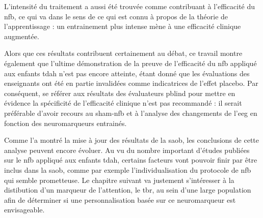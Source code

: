 L'intensité du traitement a aussi été trouvée comme contribuant à l'efficacité du \gls{nfb}, ce qui va dans le sens de ce qui est connu à propos de 
la théorie de l'apprentissage \citep{Mowrer1960} : un entrainement plus intense mène à une efficacité clinique augmentée. 

Alors que ces résultats contribuent certainement au débat, ce travail montre également que l'ultime démonstration de la preuve de l'efficacité du \gls{nfb}
appliqué aux enfants \gls{tdah} n'est pas encore atteinte, étant donné que les évaluations des enseignants ont été en partie invalidées comme indicatrices de 
l'effet placebo. Par conséquent, se référer aux résultats des évaluateurs \gls{pblind} pour mettre en évidence la spécificité de l'efficacité clinique n'est pas 
recommandé : il serait préférable d'avoir recours au sham-\gls{nfb} et à l'analyse des changements de l'\gls{eeg} en fonction des neuromarqueurs entrainés.

Comme l'a montré la mise à jour des résultats de la \gls{saob}, les conclusions de cette analyse peuvent encore évoluer. Au vu du nombre important 
d'études publiées sur le \gls{nfb} appliqué aux enfants \gls{tdah}, certains facteurs vont pouvoir finir par être inclus dans la \gls{saob}, comme par exemple 
l'individualisation du protocole de \gls{nfb} qui semble prometteuse. Le chapitre suivant va justement s'intéresser à la distibution d'un marqueur de l'attention, 
le \gls{tbr}, au sein d'une large population afin de déterminer si une personnalisation basée sur ce neuromarqueur est envisageable.




 